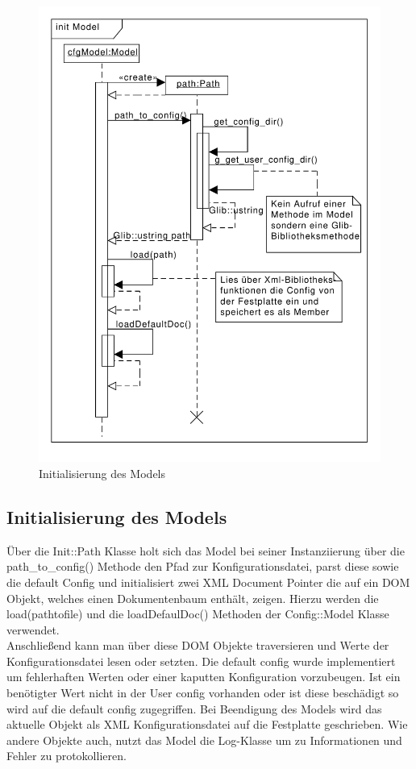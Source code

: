 \begin{figure}[htb!]
	\centering
  	\includegraphics[scale=0.6]{init.pdf}
	\caption{Initialisierung des Models}
	\label{c_modelinit}
\end{figure}


\subsection{Initialisierung des Models}

 
Über die Init::Path Klasse holt sich das Model bei seiner Instanziierung über die path\_to\_config() Methode
den Pfad zur Konfigurationsdatei, parst diese sowie die default Config und 
initialisiert zwei XML Document Pointer die auf ein DOM Objekt, welches einen Dokumentenbaum enthält, zeigen.
Hierzu werden die load(pathtofile) und die loadDefaulDoc() Methoden der Config::Model Klasse verwendet.
\\   

Anschließend kann man über diese DOM Objekte traversieren und Werte der Konfigurationsdatei lesen oder setzten.
Die default config wurde implementiert um fehlerhaften Werten oder einer kaputten Konfiguration vorzubeugen. Ist ein benötigter Wert
nicht in der User config vorhanden oder ist diese beschädigt so wird auf die default config zugegriffen.
Bei Beendigung des Models wird das aktuelle Objekt als XML Konfigurationsdatei auf die Festplatte geschrieben.
Wie andere Objekte auch, nutzt das Model die Log-Klasse um zu Informationen und Fehler zu protokollieren.


